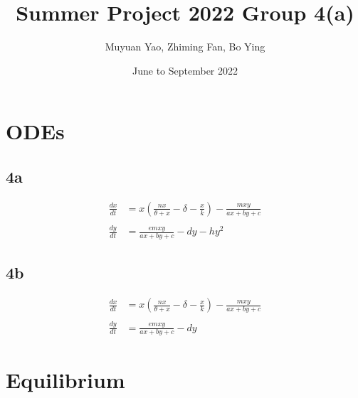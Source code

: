 \documentclass{article}
\title{Summer Project 2022 Group 4(a)}
\author{Muyuan Yao, Zhiming Fan, Bo Ying}
\date{June to September 2022}
\begin{document}
\maketitle

\section{ODEs}
\subsection{4a}
\begin{align*}
    \frac{dx}{dt}&=x\left(\frac{nx}{\theta+x}-\delta-\frac{x}{k}\right)-\frac{mxy}{ax+by+c}\\
    \\
    \frac{dy}{dt}&=\frac{emxy}{ax+by+c}-dy-hy^{2}
\end{align*}

\subsection{4b}
\begin{align*}
    \frac{dx}{dt}&=x\left(\frac{nx}{\theta+x}-\delta-\frac{x}{k}\right)-\frac{mxy}{ax+by+c}\\
    \\
    \frac{dy}{dt}&=\frac{emxy}{ax+by+c}-dy   
\end{align*}

\section{Equilibrium}
\end{document}

